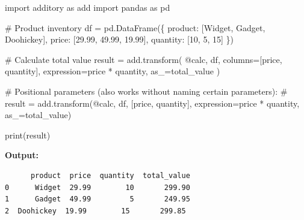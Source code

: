 \documentclass[
  letterpaper,
]{scrbook}
\newenvironment{Shaded}{\begin{snugshade}}{\end{snugshade}}
\newcommand{\BuiltInTok}[1]{\textcolor[rgb]{0.00,0.23,0.31}{#1}}
\newcommand{\CommentTok}[1]{\textcolor[rgb]{0.37,0.37,0.37}{#1}}
\newcommand{\DecValTok}[1]{\textcolor[rgb]{0.68,0.00,0.00}{#1}}
\newcommand{\FloatTok}[1]{\textcolor[rgb]{0.68,0.00,0.00}{#1}}
\newcommand{\ImportTok}[1]{\textcolor[rgb]{0.00,0.46,0.62}{#1}}
\newcommand{\NormalTok}[1]{\textcolor[rgb]{0.00,0.23,0.31}{#1}}
\newcommand{\OperatorTok}[1]{\textcolor[rgb]{0.37,0.37,0.37}{#1}}
\newcommand{\StringTok}[1]{\textcolor[rgb]{0.13,0.47,0.30}{#1}}
\begin{document}
\begin{Shaded}
\begin{Highlighting}[]
\ImportTok{import}\NormalTok{ additory }\ImportTok{as}\NormalTok{ add}
\ImportTok{import}\NormalTok{ pandas }\ImportTok{as}\NormalTok{ pd}

\CommentTok{\# Product inventory}
\NormalTok{df }\OperatorTok{=}\NormalTok{ pd.DataFrame(\{}
    \StringTok{\textquotesingle{}product\textquotesingle{}}\NormalTok{: [}\StringTok{\textquotesingle{}Widget\textquotesingle{}}\NormalTok{, }\StringTok{\textquotesingle{}Gadget\textquotesingle{}}\NormalTok{, }\StringTok{\textquotesingle{}Doohickey\textquotesingle{}}\NormalTok{],}
    \StringTok{\textquotesingle{}price\textquotesingle{}}\NormalTok{: [}\FloatTok{29.99}\NormalTok{, }\FloatTok{49.99}\NormalTok{, }\FloatTok{19.99}\NormalTok{],}
    \StringTok{\textquotesingle{}quantity\textquotesingle{}}\NormalTok{: [}\DecValTok{10}\NormalTok{, }\DecValTok{5}\NormalTok{, }\DecValTok{15}\NormalTok{]}
\NormalTok{\})}

\CommentTok{\# Calculate total value}
\NormalTok{result }\OperatorTok{=}\NormalTok{ add.transform(}
    \StringTok{\textquotesingle{}@calc\textquotesingle{}}\NormalTok{,}
\NormalTok{    df,}
\NormalTok{    columns}\OperatorTok{=}\NormalTok{[}\StringTok{\textquotesingle{}price\textquotesingle{}}\NormalTok{, }\StringTok{\textquotesingle{}quantity\textquotesingle{}}\NormalTok{],}
\NormalTok{    expression}\OperatorTok{=}\StringTok{\textquotesingle{}price * quantity\textquotesingle{}}\NormalTok{,}
\NormalTok{    as\_}\OperatorTok{=}\StringTok{\textquotesingle{}total\_value\textquotesingle{}}
\NormalTok{)}

\CommentTok{\# Positional parameters (also works without naming certain parameters):}
\CommentTok{\# result = add.transform(\textquotesingle{}@calc\textquotesingle{}, df, [\textquotesingle{}price\textquotesingle{}, \textquotesingle{}quantity\textquotesingle{}], expression=\textquotesingle{}price * quantity\textquotesingle{}, as\_=\textquotesingle{}total\_value\textquotesingle{})}

\BuiltInTok{print}\NormalTok{(result)}
\end{Highlighting}
\end{Shaded}

\textbf{Output:}

\begin{verbatim}
      product  price  quantity  total_value
0      Widget  29.99        10       299.90
1      Gadget  49.99         5       249.95
2  Doohickey  19.99        15       299.85
\end{verbatim}
\end{document}
